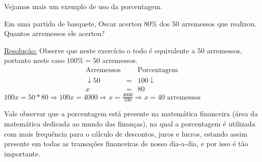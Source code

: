 Vejamos mais um exemplo de uso da porcentagem.

\begin{exem}
 Em uma partida de basquete, Oscar acertou $80\%$ dos $50$ arremessos que realizou. Quantos arremessos ele acertou?

 \underline{Resolução:}
 Observe que neste exercício o todo é equivalente a $50$ arremessos, portanto neste caso $100 \%= 50$ arremessos.
  \begin{eqnarray*}
  \text{Arremessos} & & \text{Porcentagem} \\
  \downarrow 50 & = & 100 \downarrow \\
  x & = & 80
 \end{eqnarray*}
 $100 x = 50*80 \Rightarrow 100 x = 4000 \Rightarrow x = \frac{4000}{100} \Rightarrow x= 40 \text{ arremessos}$
 \fim

\end{exem}

Vale observar que a porcentagem está presente na matemática financeira (área da matemática dedicada ao mundo das finanças), na qual a porcentagem é utilizada com mais frequência para o cálculo de descontos, juros e lucros, estando assim presente em todas as transações financeiras de nosso dia-a-dia, e por isso é tão importante.


